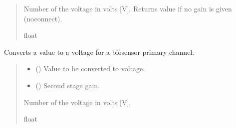 \documentclass[letterpaper,10pt,english]{sphinxmanual}
\begin{document}
\begin{fulllineitems}
\begin{fulllineitems}
\begin{quote}
\begin{description}
\begin{itemize}
\end{itemize}

\sphinxAtStartPar
Number of the voltage in volts {[}V{]}. Returns value if no gain is given (no\sphinxhyphen{}connect).

\sphinxAtStartPar
float

\end{description}\end{quote}

\end{fulllineitems}


\begin{fulllineitems}
\label{\detokenize{Morelia.Packets:Morelia.Packets.Binary5.PacketBinary5._Voltage_PrimaryChannels_Biosensor}}
\pysigstartsignatures
{}
\pysigstopsignatures
\sphinxAtStartPar
Converts a value to a voltage for a biosensor primary channel.
\begin{quote}\begin{description}
\begin{itemize}
\item {} 
\sphinxAtStartPar
{} () \textendash{} Value to be converted to voltage.

\item {} 
\sphinxAtStartPar
{} () \textendash{} Second stage gain.

\end{itemize}

\sphinxAtStartPar
Number of the voltage in volts {[}V{]}.

\sphinxAtStartPar
float

\end{description}\end{quote}


\end{fulllineitems}
\end{fulllineitems}
\end{document}

